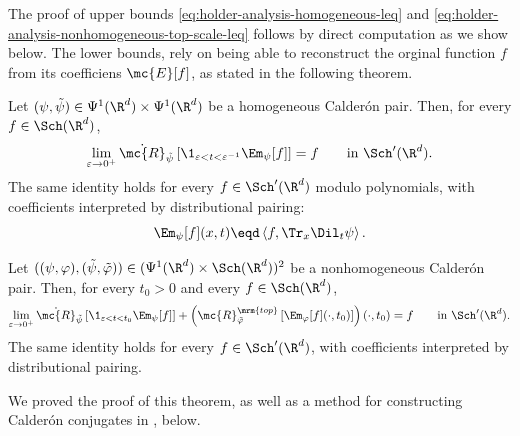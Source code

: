The proof of upper bounds \eqref{eq:holder-analysis-homogeneous-leq} and \eqref{eq:holder-analysis-nonhomogeneous-top-scale-leq} follows by direct computation as we show below. The lower bounds, rely on being able to reconstruct the orginal function \(f\) from its coefficiens \(\mc{E}[f]\), as stated in the following theorem. 

\begin{theorem} \label{thm:calderon-reproducing} Let \((\psi,\tilde{\psi})\in\Psi^{1}(\R^d)\times\Psi^{1}(\R^d)\) be a homogeneous Calder\'on pair.
Then, for every \(f\in\Sch(\R^d)\),
\begin{equation}
\label{eq:homogeneous-calderon-formula}
\lim_{\varepsilon\to0^+}
\dot{\mc{R}}_{\tilde{\psi}}
\left[\1_{\varepsilon<t<\varepsilon^{-1}}\Em_\psi[f]\right]
=
f
\qquad \text{in } \Sch'(\R^d).
\end{equation}
The same identity holds for every \(f\in\Sch'(\R^d)\) modulo polynomials, with coefficients interpreted by distributional pairing:
\[
\Em_\psi[f](x,t)\eqd
\left\langle f,\Tr_x\Dil_t\psi\right\rangle .
\]

Let \(((\psi,\varphi),(\tilde{\psi},\tilde{\varphi})) \in (\Psi^{1}(\R^d)\times\Sch(\R^d))^{2}\) be a nonhomogeneous Calder\'on pair.
Then, for every \(t_0>0\) and every \(f\in\Sch(\R^d)\),
\begin{equation}
\label{eq:nonhomogeneous-calderon-formula-top-scale}
\lim_{\varepsilon\to0^+}
\dot{\mc{R}}_{\tilde{\psi}}
\left[\1_{\varepsilon<t<t_0}\Em_\psi[f]\right]
+
\left(
\mc{R}^{\mrm{top}}_{\tilde{\varphi}}
\left[\Em_\varphi[f](\cdot,t_0)\right]
\right)(\cdot,t_0)
=
f
\qquad \text{in } \Sch'(\R^d).
\end{equation}
The same identity holds for every \(f\in\Sch'(\R^d)\), with coefficients interpreted by distributional pairing.
\end{theorem}
We proved the proof of this theorem, as well as a method for constructing Calderón conjugates in , below. 



